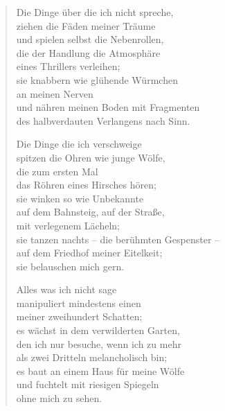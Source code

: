 
\cleartoverso


\begin{verse}

Die Dinge über die ich nicht spreche,\\
ziehen die Fäden meiner Träume\\
und spielen selbst die Nebenrollen,\\
die der Handlung die Atmosphäre\\
eines Thrillers verleihen;\\
sie knabbern wie glühende Würmchen\\
an meinen Nerven\\
und nähren meinen Boden mit Fragmenten\\
des halbverdauten Verlangens nach Sinn.

Die Dinge die ich verschweige\\
spitzen die Ohren wie junge Wölfe,\\
die zum ersten Mal\\
das Röhren eines Hirsches hören;\\
sie winken so wie Unbekannte\\
auf dem Bahnsteig, auf der Straße,\\
mit verlegenem Lächeln;\\
sie tanzen nachts -- die berühmten Gespenster --\\
auf dem Friedhof meiner Eitelkeit;\\
sie belauschen mich gern.

Alles was ich nicht sage\\
manipuliert mindestens einen\\
meiner zweihundert Schatten;\\
es wächst in dem verwilderten Garten,\\
den ich nur besuche, wenn ich zu mehr\\
als zwei Dritteln melancholisch bin;\\
es baut an einem Haus für meine Wölfe\\
und fuchtelt mit riesigen Spiegeln\\
ohne mich zu sehen.

\end{verse}

\clearpage


